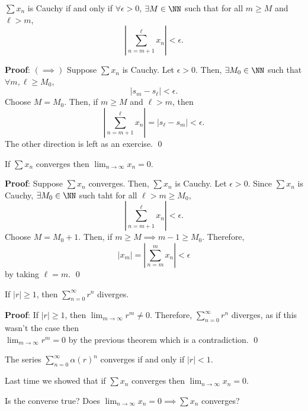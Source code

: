 \begin{theorem}
$\sum x_n$ is Cauchy if and only if $\forall \epsilon>0$, $\exists M\in \NN$ such that for all $m \geq M$ and $\ell >m$,
\[
\left|\sum_{n=m+1}^\ell x_n\right| < \epsilon.
\]
\end{theorem}
\textbf{Proof}: $(\implies)$ Suppose $\sum x_n$ is Cauchy. Let $\epsilon>0$. Then, $\exists M_0\in \NN$ such that $\forall m,\ell \geq M_0$,
\[
|s_m - s_{\ell}| < \epsilon.
\]
Choose $M = M_0$. Then, if $m\geq M$ and $\ell >m$, then
\[
\left|\sum_{n=m+1}^\ell x_n\right| = |s_\ell -s_m| < \epsilon.
\]
The other direction is left as an exercise. \qed

\begin{theorem}
If $\sum x_n$ converges then $\lim_{n\to \infty} x_n = 0$.
\end{theorem}
\textbf{Proof}: Suppose $\sum x_n$ converges. Then, $\sum x_n$ is Cauchy. Let $\epsilon>0$. Since $\sum x_n$ is Cauchy, $\exists M_0 \in \NN$ such taht for all $\ell>m\geq M_0$, 
\[
\left|\sum_{n=m+1}^\ell x_n\right| < \epsilon.
\]
Choose $M = M_0 + 1$. Then, if $m \geq M \implies m-1\geq M_0$. Therefore, 
\[
|x_m| = \left|\sum_{n=m}^m x_n\right| < \epsilon
\]
by taking $\ell = m$. \qed 

\begin{theorem}
If $|r| \geq 1$, then $\sum_{n=0}^\infty r^n$ diverges.
\end{theorem}
\textbf{Proof}: If $|r|\geq 1$, then $\lim_{m\to \infty}r^m \neq 0$. Therefore, 
$\sum_{n=0}^\infty r^n$ diverges, as if this wasn't the case then \\
$\lim_{m\to \infty} r^m =0$ by the previous theorem which is a contradiction. \qed 

\begin{corollary}
The series $\sum_{n=0}^\infty \alpha(r)^n$ converges if and only if $|r|< 1$.
\end{corollary}


\begin{recall}
Last time we showed that if $\sum x_n$ converges then $\lim_{n\to \infty} x_n = 0$.
\end{recall}

\begin{question}
Is the converse true? Does $\lim_{n\to \infty} x_n = 0 \implies \sum x_n$ converges?
\end{question}


